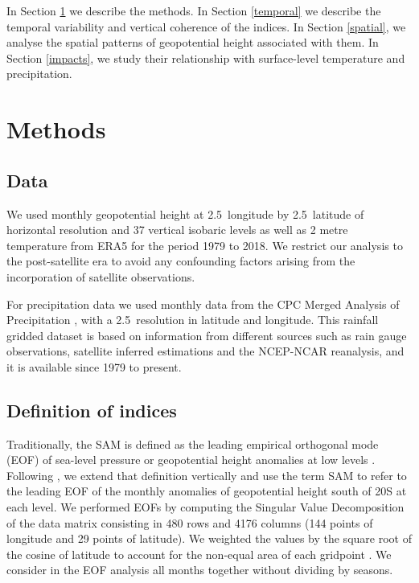 \documentclass[smallextended]{svjour3}       %
\begin{document}
In Section \ref{methods} we describe the methods.
In Section \ref{temporal} we describe the temporal variability and vertical coherence of the indices.
In Section \ref{spatial}, we analyse the spatial patterns of geopotential height associated with them.
In Section \ref{impacts}, we study their relationship with surface-level temperature and precipitation.

\hypertarget{methods}{%
\section{Methods}\label{methods}}

\hypertarget{data}{%
\subsection{Data}\label{data}}

We used monthly geopotential height at 2.5\degree~longitude by 2.5\degree~latitude of horizontal resolution and 37 vertical isobaric levels as well as 2 metre temperature from ERA5 \citep{hersbach2020} for the period 1979 to 2018.
We restrict our analysis to the post-satellite era to avoid any confounding factors arising from the incorporation of satellite observations.

For precipitation data we used monthly data from the CPC Merged Analysis of Precipitation \citep{xie1997}, with a 2.5\degree~resolution in latitude and longitude.
This rainfall gridded dataset is based on information from different sources such as rain gauge observations, satellite inferred estimations and the NCEP-NCAR reanalysis, and it is available since 1979 to present.

\hypertarget{definition-of-indices}{%
\subsection{Definition of indices}\label{definition-of-indices}}

Traditionally, the SAM is defined as the leading empirical orthogonal mode (EOF) of sea-level pressure or geopotential height anomalies at low levels \citep{ho2012}.
Following \citet{baldwin2001}, we extend that definition vertically and use the term SAM to refer to the leading EOF of the monthly anomalies of geopotential height south of 20\degree S at each level.
We performed EOFs by computing the Singular Value Decomposition of the data matrix consisting in 480 rows and 4176 columns (144 points of longitude and 29 points of latitude).
We weighted the values by the square root of the cosine of latitude to account for the non-equal area of each gridpoint \citep{chung1999}.
We consider in the EOF analysis all months together without dividing by seasons.
\end{document}
